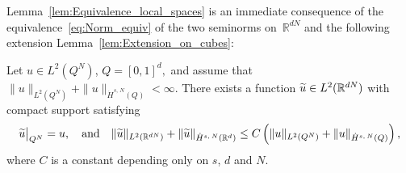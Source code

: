 \documentclass[AHL, Unicode, longabstracts, published]{cedram}
\newcommand*\R {\mathbb{R}}
\newcommand\1{{\ensuremath {\mathds 1} }}
\let\oldtilde\tilde
\renewcommand*{\tilde}[1]{\mathchoice{\widetilde{#1}}{\widetilde{#1}}{\oldtilde{#1}}{\oldtilde{#1}}}\let\oldhat\hat
\renewcommand*{\hat}[1]{\mathchoice{\widehat{#1}}{\widehat{#1}}{\oldhat{#1}}{\oldhat{#1}}}\let\oldforall\forall
\renewcommand*{\forall}{\mathrel{\oldforall}}
\begin{document}
Lemma~\ref{lem:Equivalence_local_spaces} is an immediate consequence of the equivalence~\eqref{eq:Norm_equiv} of the two seminorms on~$\R^{dN}$ and the following extension Lemma~\ref{lem:Extension_on_cubes}:

\begin{lemm}\label{lem:Extension_on_cubes}
Let $u\in L^2(Q^N)$, $Q=[0, 1]^{d},$ and assume that $\|u\|_{L^2(Q^N)}+\|u\|_{\dot{H}^{s,\,N}(Q)}<\infty$. There exists a function $\tilde u\in L^2(\R^{dN})$ with compact support satisfying
\begin{equation*}
\tilde u\big|_{Q^N}=u,
\quad \text{and} \quad
\|\tilde u\|_{L^2(\R^{dN})}+\|\tilde u\|_{\dot{H}^{s,\,N}(\R^{d})}\leq C \left(\|u\|_{L^2\left(Q^N\right)}+\|u\|_{\dot{H}^{s,\,N}(Q)}\right),
\end{equation*}
where $C$ is a constant depending only on $s$, $d$ and $N$.
\end{lemm}
\end{document}
